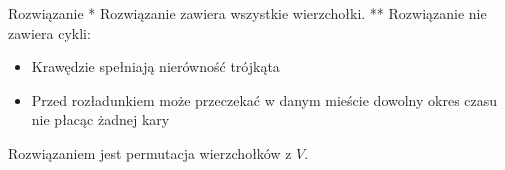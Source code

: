\begin{block}{Rozwiązanie}
	* Rozwiązanie zawiera wszystkie wierzchołki.
	** Rozwiązanie nie zawiera cykli:
	\begin{itemize}
		\item Krawędzie spełniają nierówność trójkąta
		\item Przed rozładunkiem może przeczekać w danym mieście dowolny okres czasu nie płacąc żadnej kary
	\end{itemize}
	Rozwiązaniem jest permutacja wierzchołków z $V$.
\end{block}

